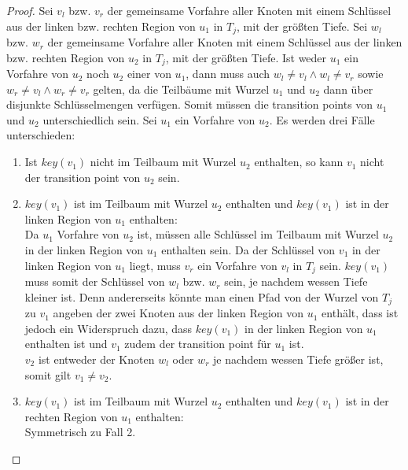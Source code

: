 \documentclass[a4paper,12pt]{article}
\begin{document}
\begin{proof}
	Sei $v_l$ bzw. $v_r$ der gemeinsame Vorfahre aller Knoten mit einem Schlüssel aus der linken bzw. rechten Region von $u_1$ in $T_j$, mit der größten Tiefe.  Sei $w_l$ bzw. $w_r$ der gemeinsame Vorfahre aller Knoten mit einem Schlüssel aus der linken bzw. rechten Region von $u_2$ in $T_j$, mit der größten Tiefe. Ist weder $u_1$ ein Vorfahre von $u_2$ noch $u_2$ einer von $u_1$, dann muss auch $w_l \ne v_l \land w_l \ne v_r$ sowie $w_r \ne v_l \land w_r \ne v_r$ gelten, da die Teilbäume mit Wurzel $u_1$ und $u_2$ dann über disjunkte Schlüsselmengen verfügen. Somit müssen die transition points von $u_1$ und $u_2$ unterschiedlich sein. Sei $u_1$ ein Vorfahre von $u_2$. Es werden drei Fälle unterschieden:
	\begin{enumerate}
		\item Ist $\mathit{key}\left(v_1\right)$ nicht im Teilbaum mit Wurzel $u_2$ enthalten, so kann $v_1$ nicht der transition point von $u_2$ sein.
		\item $\mathit{key}\left(v_1\right)$ ist im Teilbaum mit Wurzel $u_2$ enthalten und $\mathit{key}\left(v_1\right)$ ist  in der linken Region von $u_1$ enthalten:\\
		Da $u_1$ Vorfahre von $u_2$ ist, müssen alle Schlüssel im Teilbaum mit Wurzel $u_2$ in der linken Region von $u_1$ enthalten sein. Da der Schlüssel von $v_1$ in der linken Region von $u_1$ liegt, muss $v_r$ ein Vorfahre von $v_l$ in $T_j$ sein. $\mathit{key}\left(v_1\right)$ muss somit der Schlüssel von $w_l$ bzw. $w_r$ sein, je nachdem wessen Tiefe kleiner ist. Denn andererseits könnte man einen Pfad von der Wurzel von $T_j$ zu $v_1$ angeben der zwei Knoten aus der linken Region von $u_1$ enthält, dass ist jedoch ein Widerspruch dazu, dass  $\mathit{key}\left(v_1\right)$ in der linken Region von $u_1$ enthalten ist und $v_1$ zudem der transition point für $u_1$ ist.\\
		$v_2$ ist entweder der Knoten $w_l$ oder $w_r$ je nachdem wessen Tiefe größer ist, somit gilt $v_1 \ne v_2$.
		\item $\mathit{key}\left(v_1\right)$ ist im Teilbaum mit Wurzel $u_2$ enthalten und $\mathit{key}\left(v_1\right)$ ist in der rechten Region von $u_1$ enthalten:\\
		Symmetrisch zu Fall 2.
	\end{enumerate}
	
	
	
	
	
	
\end{proof}
\end{document}
